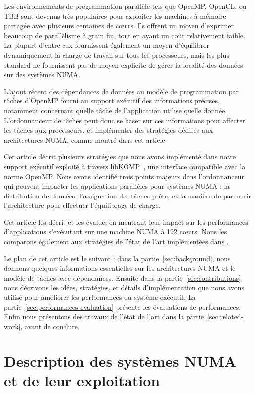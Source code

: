 \documentclass[parallelisme]{compas2016}
\begin{document}
Les environnements de programmation parallèle tels que OpenMP, OpenCL, ou TBB sont devenus très
populaires pour exploiter les machines à mémoire partagée avec plusieurs centaines de cœurs.
Ils offrent un moyen d'exprimer beaucoup de parallélisme à grain fin, tout en
ayant un coût relativement faible. La plupart d'entre eux fournissent également
un moyen d'équilibrer dynamiquement la charge de travail sur tous les processeurs,
mais les plus standard ne fournissent pas de moyen explicite de gérer la localité
des données sur des systèmes NUMA.

L'ajout récent des dépendances de données au modèle de programmation par tâches
d'OpenMP fourni au support exécutif des informations précises, notamment concernant
quelle tâche de l'application utilise quelle donnée.
L'ordonnanceur de tâches peut donc se baser sur ces informations pour affecter
les tâches aux processeurs, et implémenter des stratégies dédiées aux architectures
NUMA, comme montré dans cet article.

Cet article décrit plusieurs stratégies que nous avons implémenté dans notre support
exécutif \kaapi exploité à travers libKOMP~\cite{libkomp}, une interface compatible avec la norme OpenMP.
Nous avons identifié trois points majeurs dans l'ordonnanceur qui
peuvent impacter les applications parallèles pour systèmes NUMA : la distribution
de données, l'assignation des tâches prête, et la manière de parcourir l'architecture
pour effectuer l'équilibrage de charge.

Cet article les décrit et les évalue, en montrant leur impact sur les performances
d'applications s'exécutant sur une machine NUMA à 192 cœurs.
Nous les comparons également aux stratégies de l'état de l'art implémentées dans \kaapi.

Le plan de cet article est le suivant : dans la partie~\ref{sec:background},
nous donnons quelques informations essentielles sur les architectures NUMA et
le modèle de tâches avec dépendances. Ensuite dans la partie~\ref{sec:contributions}
nous décrivons les idées, stratégies, et détails d'implémentation que nous avons
utilisé pour améliorer les performances du système exécutif. La partie~\ref{sec:performances-evaluation}
présente les évaluations de performances. Enfin nous présentons des travaux de l'état
de l'art dans la partie~\ref{sec:related-work}, avant de conclure.


\vspace*{-1ex}
\section{Description des systèmes NUMA et de leur exploitation}
\end{document}
